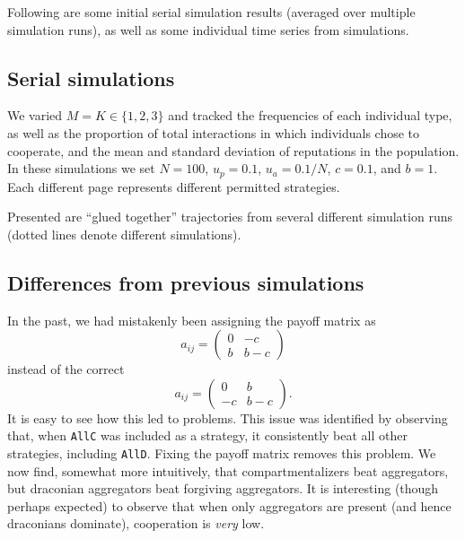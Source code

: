 \documentclass[13pt]{amsart}
\begin{document}
Following are some initial serial simulation results (averaged over multiple simulation runs), as well as some individual time series from simulations.

\clearpage

\subsection*{Serial simulations}

We varied $M = K \in \{1, 2, 3\}$ and tracked the frequencies of each individual type, as well as the proportion of total interactions in which individuals chose to cooperate, and the mean and standard deviation of reputations in the population.
In these simulations we set $N = 100$, $u_p = 0.1$, $u_a = 0.1/N$, $c = 0.1$, and $b = 1$.
Each different page represents different permitted strategies.

Presented are ``glued together'' trajectories from several different simulation runs (dotted lines denote different simulations).

\subsection*{Differences from previous simulations}

In the past, we had mistakenly been assigning the payoff matrix as
\begin{equation}
    a_{ij} =
    \begin{pmatrix}
        0 & -c \\
        b & b-c
    \end{pmatrix}
\end{equation}
instead of the correct
\begin{equation}
    a_{ij} =
    \begin{pmatrix}
        0 & b \\
        -c & b-c
    \end{pmatrix}.
\end{equation}
It is easy to see how this led to problems.
This issue was identified by observing that, when \texttt{AllC} was included as a strategy, it consistently beat all other strategies, including \texttt{AllD}.
Fixing the payoff matrix removes this problem.
We now find, somewhat more intuitively, that compartmentalizers beat aggregators, but draconian aggregators beat forgiving aggregators.
It is interesting (though perhaps expected) to observe that when only aggregators are present (and hence draconians dominate), cooperation is \emph{very} low.
\end{document}
